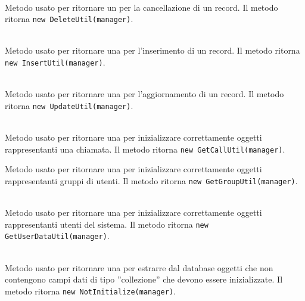 \begin{description}
	\item{}\\
	Metodo usato per ritornare un  per la cancellazione di un record. Il metodo ritorna \verb|new DeleteUtil(manager)|.
	
	\item{}\\
	Metodo usato per ritornare una  per l'inserimento di un record. Il metodo ritorna \verb|new InsertUtil(manager)|.
	
	\item{}\\
	Metodo usato per ritornare una  per l'aggiornamento di un record. Il metodo ritorna \verb|new UpdateUtil(manager)|.
	
	\item{}\\
	Metodo usato per ritornare una  per inizializzare correttamente oggetti rappresentanti una chiamata. Il metodo ritorna \verb|new GetCallUtil(manager)|.	
	
	\item{}
		Metodo usato per ritornare una  per inizializzare correttamente oggetti rappresentanti gruppi di utenti. Il metodo ritorna \verb|new GetGroupUtil(manager)|.	
	
	\item{}\\
		Metodo usato per ritornare una  per inizializzare correttamente oggetti rappresentanti utenti del sistema. Il metodo ritorna \verb|new GetUserDataUtil(manager)|.	

	\item{}\\
		Metodo usato per ritornare una  per estrarre dal database oggetti che non contengono campi dati di tipo ''collezione'' che devono essere inizializzate. Il metodo ritorna \verb|new NotInitialize(manager)|.	
		
\end{description}		

